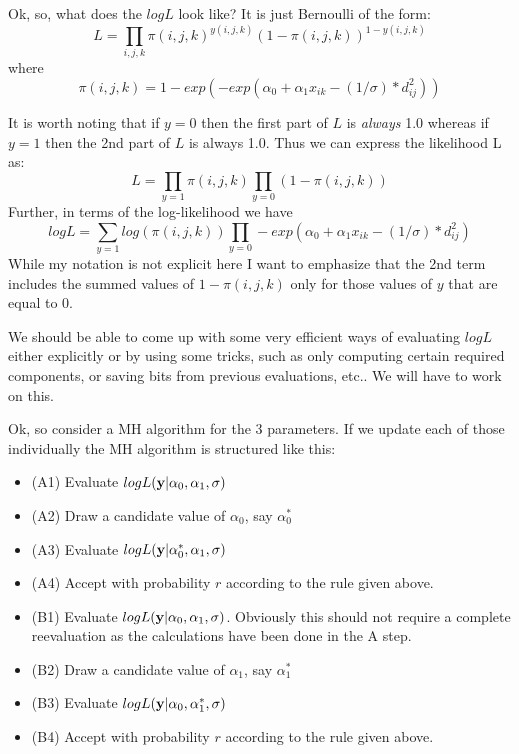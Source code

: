 \documentclass[12pt]{article}
\begin{document}
Ok, so, what does the $logL$ look like? It is just Bernoulli of the
form:
\[
L = \prod_{i,j,k}  \pi(i,j,k)^{y(i,j,k)} (1-\pi(i,j,k))^{1-y(i,j,k)}
\]
where
\[
 \pi(i,j,k) = 1-exp(- 
exp( \alpha_{0} + \alpha_{1}x_{ik} - (1/\sigma)*d_{ij}^{2} ))
\]

It is worth noting that if $y=0$ then the first part of $L$ is {\it
  always} 1.0 whereas if $y=1$ then the 2nd part of $L$ is always 1.0.
Thus we can express the likelihood L as:
\[
L = \prod_{y=1}  \pi(i,j,k) \prod_{y=0} (1-\pi(i,j,k))
\]
Further, in terms of  the log-likelihood we have
\[
logL = \sum_{y=1} log(  \pi(i,j,k) )  \prod_{y=0} 
- exp( \alpha_{0} + \alpha_{1}x_{ik} - (1/\sigma)*d_{ij}^{2} )
\]
While my notation is not explicit here I want to emphasize that the
2nd term includes the summed values of $1-\pi(i,j,k)$ only for those
values of $y$ that are equal to 0.

We should be able to come up with some very efficient ways of
evaluating $logL$ either explicitly or by using some tricks, such as
only computing certain required components, or saving bits from
previous evaluations, etc..  We will have to work on this.

Ok, so consider a MH algorithm for the 3 parameters. If we update each
of those individually the MH algorithm is structured like this:

\begin{itemize}
\item (A1) Evaluate $logL({\bf y}|\alpha_{0},\alpha_{1},\sigma)$

\item (A2)  Draw a candidate value of $\alpha_{0}$, say $\alpha_{0}^{*}$

\item (A3) Evaluate $logL({\bf y}|\alpha_{0}^{*},\alpha_{1},\sigma)$

\item (A4) Accept with probability $r$ according to the rule given above.
\end{itemize}

\begin{itemize}
\item (B1) Evaluate $logL({\bf y}|\alpha_{0},\alpha_{1},\sigma)$. Obviously
 this should not require a complete reevaluation as the calculations
 have been done in the A step.

\item (B2)  Draw a candidate value of $\alpha_{1}$, say $\alpha_{1}^{*}$

\item (B3) Evaluate $logL({\bf y}|\alpha_{0},\alpha_{1}^{*},\sigma)$

\item (B4) Accept with probability $r$ according to the rule given above.
\end{itemize}
\end{document}
